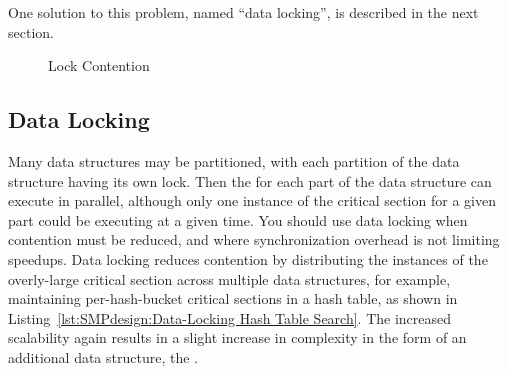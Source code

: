 

One solution to this problem, named ``data locking'', is described
in the next section.

\begin{figure}
\centering
{}
\caption{Lock Contention}
\end{figure}

\subsection{Data Locking}
\label{sec:SMPdesign:Data Locking}

Many data structures may be partitioned,
with each partition of the data structure having its own lock.
Then the  for each part of the data structure
can execute in parallel,
although only one instance of the critical section for a given
part could be executing at a given time.
You should use data locking when contention must
be reduced, and where synchronization overhead is not
limiting speedups.
Data locking reduces contention by distributing the instances
of the overly-large critical section across multiple data structures,
for example, maintaining per-hash-bucket critical sections in a
hash table, as shown in
Listing~\ref{lst:SMPdesign:Data-Locking Hash Table Search}.
The increased scalability again results in a slight increase in complexity
in the form of an additional data structure, the .

